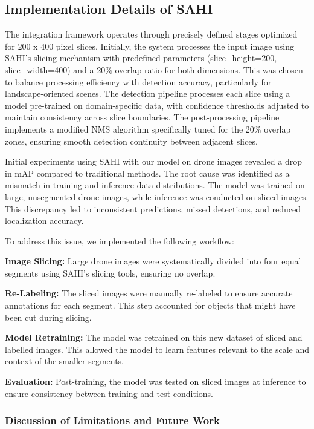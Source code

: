 \documentclass[preprint,review,12pt]{elsarticle}
\begin{document}
\subsection{Implementation Details of SAHI}
The integration framework operates through precisely defined stages optimized for 200 x 400 pixel slices. Initially, the system processes the input image using SAHI's slicing mechanism with predefined parameters (slice\_height=200, slice\_width=400) and a 20\% overlap ratio for both dimensions. This was chosen to balance processing efficiency with detection accuracy, particularly for landscape-oriented scenes. The detection pipeline processes each slice using a model pre-trained on domain-specific data, with confidence thresholds adjusted to maintain consistency across slice boundaries. The post-processing pipeline implements a modified NMS algorithm specifically tuned for the 20\% overlap zones, ensuring smooth detection continuity between adjacent slices.

Initial experiments using SAHI with our model on drone images revealed a drop in mAP compared to traditional methods. The root cause was identified as a mismatch in training and inference data distributions. The model was trained on large, unsegmented drone images, while inference was conducted on sliced images. This discrepancy led to inconsistent predictions, missed detections, and reduced localization accuracy.

To address this issue, we implemented the following workflow:

\textbf{Image Slicing:} Large drone images were systematically divided into four equal segments using SAHI’s slicing tools, ensuring no overlap.

\textbf{Re-Labeling:} The sliced images were manually re-labeled to ensure accurate annotations for each segment. This step accounted for objects that might have been cut during slicing.

\textbf{Model Retraining:} The model was retrained on this new dataset of sliced and labelled images. This allowed the model to learn features relevant to the scale and context of the smaller segments.

\textbf{Evaluation:} Post-training, the model was tested on sliced images at inference to ensure consistency between training and test conditions.


\subsubsection{Discussion of Limitations and Future Work}
\end{document}
